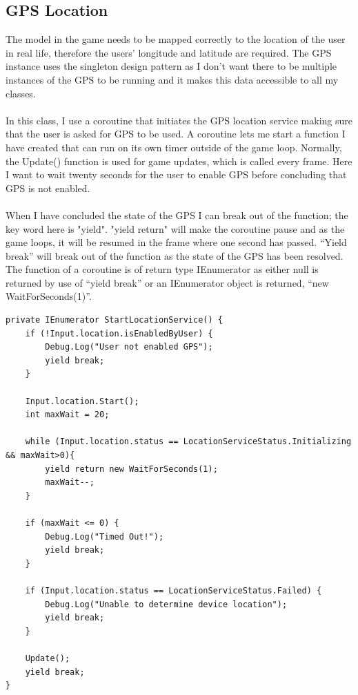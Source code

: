 \documentclass[a4paper]{report}
\begin{document}
\subsection{GPS Location}
The model in the game needs to be mapped correctly to the location of the user in real life, therefore the users' longitude and latitude are required. The GPS instance uses the singleton design pattern as I don’t want there to be multiple instances of the GPS to be running and it makes this data accessible to all my classes. 
\\\\
In this class, I use a coroutine that initiates the GPS location service making sure that the user is asked for GPS to be used. A coroutine lets me start a function I have created that can run on its own timer outside of the game loop. Normally, the Update() function is used for game updates, which is called every frame. Here I want to wait twenty seconds for the user to enable GPS before concluding that GPS is not enabled. 
\\\\
When I have concluded the state of the GPS I can break out of the function; the key word here is "yield". "yield return" will make the coroutine pause and as the game loops, it will be resumed in the frame where one second has passed. “Yield break” will break out of the function as the state of the GPS has been resolved. The function of a coroutine is of return type IEnumerator as either null is returned by use of “yield break” or an IEnumerator object is returned, “new WaitForSeconds(1)”. \cite{Unity} \cite{GPS}
\begin{Verbatim}[tabsize=4]
private IEnumerator StartLocationService() {
	if (!Input.location.isEnabledByUser) {
		Debug.Log("User not enabled GPS");
		yield break;
	}
	
	Input.location.Start();
	int maxWait = 20;
	
	while (Input.location.status == LocationServiceStatus.Initializing && maxWait>0){
		yield return new WaitForSeconds(1);
		maxWait--;
	}
	
	if (maxWait <= 0) {
		Debug.Log("Timed Out!");
		yield break;
	}
	
	if (Input.location.status == LocationServiceStatus.Failed) {
		Debug.Log("Unable to determine device location");
		yield break;
	}
	
	Update();
	yield break;
}
\end{Verbatim}
\end{document}
